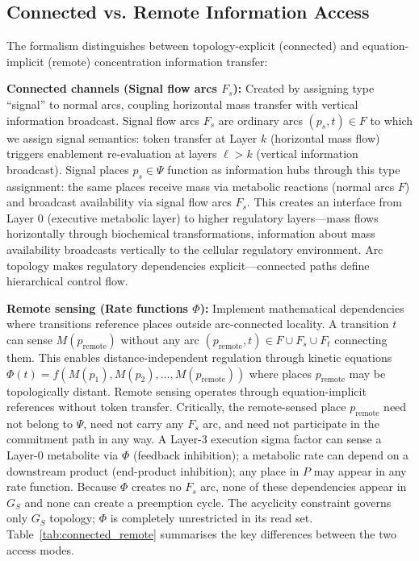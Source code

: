 \documentclass[10pt,letterpaper]{article}
\providecommand{\DIFaddtex}[1]{{\protect\color{blue}\uwave{#1}}} %
\providecommand{\DIFdeltex}[1]{{\protect\color{red}\sout{#1}}}                      %
\providecommand{\DIFaddbegin}{} %
\providecommand{\DIFaddend}{} %
\providecommand{\DIFdelbegin}{} %
\providecommand{\DIFdelend}{} %
\providecommand{\DIFadd}[1]{\texorpdfstring{\DIFaddtex{#1}}{#1}} %
\providecommand{\DIFdel}[1]{\texorpdfstring{\DIFdeltex{#1}}{}} %
\newcommand{\DIFscaledelfig}{0.5}
\newlength{\DIFdelgraphicswidth} %
\newlength{\DIFdelgraphicsheight} %
\newcommand{\DIFaddincludegraphics}[2][]{{\color{blue}\fbox{\DIFOincludegraphics[#1]{#2}}}} %
\newcommand{\DIFdelincludegraphics}[2][]{%
\sbox{\DIFdelgraphicsbox}{\DIFOincludegraphics[#1]{#2}}%
\settoboxwidth{\DIFdelgraphicswidth}{\DIFdelgraphicsbox} %
\settoboxtotalheight{\DIFdelgraphicsheight}{\DIFdelgraphicsbox} %
\scalebox{\DIFscaledelfig}{%
\parbox[b]{\DIFdelgraphicswidth}{\usebox{\DIFdelgraphicsbox}\\[-\baselineskip] \rule{\DIFdelgraphicswidth}{0em}}\llap{\resizebox{\DIFdelgraphicswidth}{\DIFdelgraphicsheight}{%
\setlength{\unitlength}{\DIFdelgraphicswidth}%
\begin{picture}(1,1)%
\thicklines\linethickness{2pt} %
{\color[rgb]{1,0,0}\put(0,0){\framebox(1,1){}}}%
{\color[rgb]{1,0,0}\put(0,0){\line( 1,1){1}}}%
{\color[rgb]{1,0,0}\put(0,1){\line(1,-1){1}}}%
\end{picture}%
}\hspace*{3pt}}} %
} %
\DeclareRobustCommand{\DIFaddbegin}{\DIFOaddbegin \let\includegraphics\DIFaddincludegraphics} %
\DeclareRobustCommand{\DIFaddend}{\DIFOaddend \let\includegraphics\DIFOincludegraphics} %
\DeclareRobustCommand{\DIFdelbegin}{\DIFOdelbegin \let\includegraphics\DIFdelincludegraphics} %
\DeclareRobustCommand{\DIFdelend}{\DIFOaddend \let\includegraphics\DIFOincludegraphics} %
\begin{document}
\subsection{Connected vs. Remote Information Access}
\DIFaddbegin \label{sec:unified}
\DIFaddend 

The formalism distinguishes between topology-explicit (connected) and equation-implicit (remote) concentration information transfer:

\textbf{Connected channels (Signal flow arcs $F_s$):} Created by assigning type ``signal'' to normal arcs, coupling horizontal mass transfer with vertical information broadcast. Signal flow arcs $F_s$ are ordinary arcs $(p_s, t) \in F$ to which we assign signal semantics: token transfer at Layer $k$ (horizontal mass flow) triggers enablement re-evaluation at layers $\ell > k$ (vertical information broadcast). Signal places $p_s \in \Psi$ function as information hubs through this type assignment: the same places receive mass via metabolic reactions (normal arcs $F$) and broadcast availability via signal flow arcs $F_s$. This creates an interface from Layer 0 (executive metabolic layer) to higher regulatory layers---mass flows horizontally through biochemical transformations, information about mass availability broadcasts vertically to the cellular regulatory environment. Arc topology makes regulatory dependencies explicit---connected paths define hierarchical control flow.

\textbf{Remote sensing (Rate functions $\Phi$):} Implement mathematical dependencies where transitions reference places outside arc-connected locality. A transition $t$ can sense $M(p_{\text{remote}})$ without any arc
$(p_{\text{remote}}, t) \in F \cup F_s \cup F_t$
connecting them. This enables distance-independent regulation through kinetic equations
$\Phi(t) = f(M(p_1), M(p_2), \ldots, M(p_{\text{remote}}))$
where places $p_{\text{remote}}$ may be topologically distant. Remote sensing operates through equation-implicit references without token transfer.
Critically, the remote-sensed place $p_{\text{remote}}$ need not belong to $\Psi$, need not carry any $F_s$ arc, and need not participate in the commitment path in any way. A Layer-3 execution sigma factor can sense a Layer-0 metabolite via $\Phi$ (feedback inhibition); a metabolic rate can depend on a downstream product (end-product inhibition); any place in $P$ may appear in any rate function. Because $\Phi$ creates no $F_s$ arc, none of these dependencies appear in \DIFdelbegin \DIFdel{$G_S$ }\DIFdelend \DIFaddbegin \DIFadd{$G_s$ }\DIFaddend and none can create a preemption cycle. The acyclicity constraint governs only \DIFdelbegin \DIFdel{$G_S$ }\DIFdelend \DIFaddbegin \DIFadd{$G_s$ }\DIFaddend topology; $\Phi$ is completely unrestricted in its read set.
Table~\ref{tab:connected_remote} summarises the key differences between the two access modes.
\end{document}
